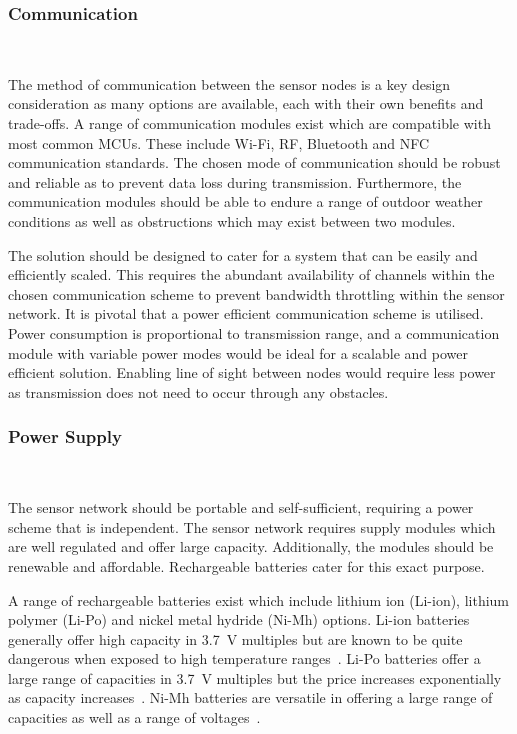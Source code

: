 \documentclass[10pt,twocolumn]{witseiepaper}
\begin{document}
		\subsubsection{Communication} $   $

			The method of communication between the sensor nodes is a key design consideration as many options are available, each with their own benefits and trade-offs. A range of communication modules exist which are compatible with most common MCUs. These include Wi-Fi, RF, Bluetooth and NFC communication standards. The chosen mode of communication should be robust and reliable as to prevent data loss during transmission. Furthermore, the communication modules should be able to endure a range of outdoor weather conditions as well as obstructions which may exist between two modules.

			The solution should be designed to cater for a system that can be easily and efficiently scaled. This requires the abundant availability of channels within the chosen communication scheme to prevent bandwidth throttling within the sensor network. It is pivotal that a power efficient communication scheme is utilised. Power consumption is proportional to transmission range, and a communication module with variable power modes would be ideal for a scalable and power efficient solution. Enabling line of sight between nodes would require less power as transmission does not need to occur through any obstacles.
			
		\subsubsection{Power Supply} $   $
			
			The sensor network should be portable and self-sufficient, requiring a power scheme that is independent. The sensor network requires supply modules which are well regulated and offer large capacity. Additionally, the modules should be renewable and affordable. Rechargeable batteries cater for this exact purpose.

			A range of rechargeable batteries exist which include lithium ion (Li-ion), lithium polymer (Li-Po) and nickel metal hydride (Ni-Mh) options. Li-ion batteries generally offer high capacity in 3.7~V multiples but are known to be quite dangerous when exposed to high temperature ranges~\cite{li-ion}. Li-Po batteries offer a large range of capacities in 3.7~V multiples but the price increases exponentially as capacity increases~\cite{li-po}. Ni-Mh batteries are versatile in offering a large range of capacities as well as a range of voltages~\cite{ni-mh}.
\end{document}
